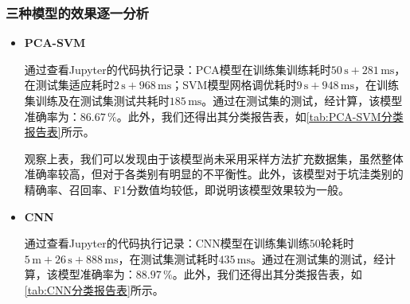 \documentclass{MathorCupmodeling}
\begin{document}
	\subsubsection{三种模型的效果逐一分析}\label{模型效果}
	\begin{itemize}
		\item \textbf{PCA-SVM}

		通过查看Jupyter的代码执行记录：PCA模型在训练集训练耗时$50\,\text{s}+281\,\text{ms}$，在测试集适应耗时$2\,\text{s}+968\,\text{ms}$；SVM模型网格调优耗时$9\,\text{s}+948\,\text{ms}$，在训练集训练及在测试集测试共耗时$185\,\text{ms}$。通过在测试集的测试，经计算，该模型准确率为：$86.67\,\%$。此外，我们还得出其分类报告表，如\textcolor{blue}{\cref{tab:PCA-SVM分类报告表}}所示。
\begin{table}[htbp]
	\centering
	\caption{PCA-SVM分类报告表}
	\label{tab:PCA-SVM分类报告表}
\end{table}
	观察上表，我们可以发现由于该模型尚未采用采样方法扩充数据集，虽然整体准确率较高，但对于各类别有明显的不平衡性。此外，该模型对于坑洼类别的精确率、召回率、F1分数值均较低，即说明该模型效果较为一般。
		\item \textbf{CNN}
		
		通过查看Jupyter的代码执行记录：CNN模型在训练集训练$50$轮耗时$5\,\text{m}+26\,\text{s}+888\,\text{ms}$，在测试集测试耗时$435\,\text{ms}$。通过在测试集的测试，经计算，该模型准确率为：$88.97\,\%$。此外，我们还得出其分类报告表，如\textcolor{blue}{\cref{tab:CNN分类报告表}}所示。
\begin{table}[htbp]
	\centering
	\caption{CNN分类报告表}
	\label{tab:CNN分类报告表}
\end{table}


\end{itemize}
\end{document}
